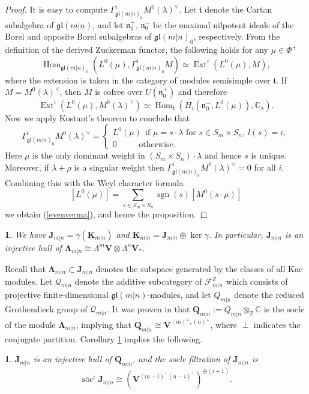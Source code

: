 \documentclass[12pt,oneside,english]{amsart}
\numberwithin{equation}{section}
\numberwithin{figure}{section}
\theoremstyle{plain}
\theoremstyle{plain}
\theoremstyle{remark}
\theoremstyle{definition}
\theoremstyle{plain}
\theoremstyle{remark}
\theoremstyle{definition}
\theoremstyle{plain}
\newtheorem{cor}[thm]{\protect\corollaryname}
\theoremstyle{plain}
\theoremstyle{definition}
\providecommand{\corollaryname}{Corollary}
\newcommand{\bV}{\mathbf{V}}
\newcommand{\bK}{\mathbf{K}}
\newcommand{\bJ}{\mathbf{J}}
\newcommand{\bQ}{\mathbf{Q}}
\newcommand{\bW}{\mathbf{\Lambda}}
\newcommand{\soc}{\operatorname{soc}}
\begin{document}
\begin{proof}
       It is easy to compute
       $\Gamma^i_{\mathfrak{gl}(m|n)_0}M^0(\lambda)^\vee$.
       Let $\mathfrak t$ denote the Cartan subalgebra of
       $\mathfrak{gl}(m|n)$, and let $\mathfrak n_0^{+}$, $\mathfrak n_0^{-}$ be the maximal
       nilpotent ideals of the Borel and opposite Borel subalgebras  of $\mathfrak{gl}(m|n)_0$, respectively.
       From the definition of the derived Zuckerman functor, the
       following holds
       for any $\mu\in \Phi^+$
       $$\operatorname{Hom}_{\mathfrak{gl}(m|n)_0}(L^0(\mu),\Gamma^i_{\mathfrak{gl}(m|n)_0} M)\simeq\operatorname{Ext}^i(L^0(\mu),M),$$
       where the extension is taken in the category of modules
       semisimple over $\mathfrak t$. If
       $M=M^0(\lambda)^\vee$, then $M$ is cofree over $U(\mathfrak n^+_0)$ and therefore
       $$\operatorname{Ext}^i(L^0(\mu),M^0(\lambda)^\vee)\simeq
       \operatorname{Hom}_{\mathfrak t}(H_i({\mathfrak n^-_0},L^0(\mu)), \mathbb C_\lambda).$$
       Now we apply Kostant's theorem to conclude that
       $$\Gamma^i_{\mathfrak{gl}(m|n)_0}M^0(\lambda)^\vee=\begin{cases}
       L^0(\mu)\ \  \text{if}\,\, \mu=s\cdot\lambda \,\,\text{for}\,\, s\in
       S_m\times S_n,\ l(s)=i,\\ 0\ \hspace{1cm} \text{otherwise}. \end{cases}$$
     Here $\mu$ is the only dominant weight in $(S_m\times S_n)\cdot\lambda$ and hence $s$ is unique. Moreover, if $\lambda+\rho$ is a singular weight then
 $\Gamma^i_{\mathfrak{gl}(m|n)_0}M^0(\lambda)^\vee=0$ for all $i$.
    Combining this with the Weyl character formula
    $$[L^0(\mu)]=\sum_{s\in S_m\times S_n}\operatorname{sgn}(s) [M^0(s\cdot\mu)]$$
      we obtain (\ref{evenverma}), and hence the proposition.
    \end{proof}
    \begin{cor}\label{fin-dim} We have
      $\bJ_{m|n}=\gamma(\bK_{m|n})$ and
      $\bK_{m|n}=\bJ_{m|n}\oplus\ker\gamma$.  In
      particular, $\bJ_{m|n}$ is an injective hull of $\bW_{m|n}\cong\Lambda^m\bV\otimes\Lambda^n\bV_*$.
      \end{cor}
Recall that  $\bW_{m|n}\subset\bJ_{m|n}$
denotes the subspace generated by the classes of all Kac modules.
Let $\mathcal Q_{m|n}$ denote the additive subcategory of $\mathcal
F_{m|n}^{\mathbb{Z}}$  which consists
of projective finite-dimensional $\mathfrak {gl}(m|n)$-modules, and
let $Q_{m|n}$ denote the reduced Grothendieck group of $\mathcal
Q_{m|n}$.    It was proven  in \cite[Theorem 3.11]{CS} that
$\bQ_{m|n}:= Q_{m|n}\otimes_{\mathbb{Z}}\mathbb{C}$ is the socle of
the module $\bW_{m|n}$, implying that $\bQ_{m|n}\cong
\bV^{(m)^\perp,(n)^{\perp}}$, where $\perp$ indicates the conjugate partition.
Corollary \ref{fin-dim} implies  the following.
 \begin{cor}\label{fin-dim2} $\bJ_{m|n}$ is an injective hull of $\bQ_{m|n}$,  and the socle filtration of $\bJ_{m|n}$ is
\[
\overline{\soc}^i \bJ_{m|n}\cong\left(\bV^{\left(m-i\right)^{\perp}\left(n-i\right)^{\perp}}\right)^{\oplus (i+1)}.
\]
      \end{cor}
\end{document}
